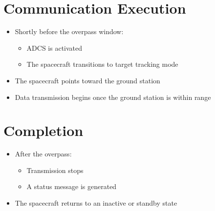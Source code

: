 \documentclass[letterpaper,11pt,oneside,english]{scrreprt}
\begin{document}
	\section{Communication Execution}
	
	\begin{itemize}
		\item Shortly before the overpass window:
		\begin{itemize}
			\item ADCS is activated
			\item The spacecraft transitions to target tracking mode
		\end{itemize}
		
		\item The spacecraft points toward the ground station
		
		\item Data transmission begins once the ground station is within range
	\end{itemize}
	
	\section{Completion}
	
	\begin{itemize}
		\item After the overpass:
		\begin{itemize}
			\item Transmission stops
			\item A status message is generated
		\end{itemize}
		
		\item The spacecraft returns to an inactive or standby state
	\end{itemize}
	
	
\end{document}
